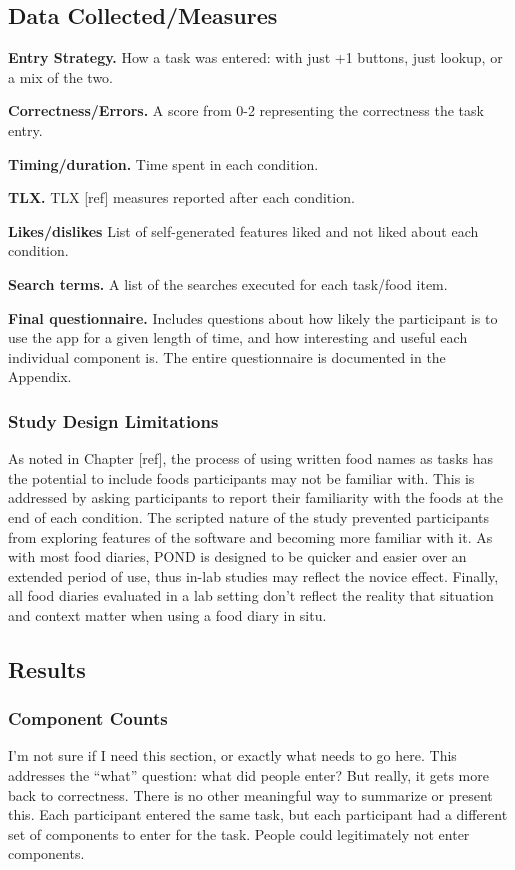 \subsection{Data Collected/Measures}
\begin{enumerate*}
\item \textbf{Entry Strategy.} How a task was entered: with just +1 buttons, just lookup, or a mix of the two. 
\item \textbf{Correctness/Errors. } A score from 0-2 representing the correctness the task entry. 
\item \textbf{Timing/duration.} Time spent in each condition. 
\item \textbf{TLX.} TLX [ref] measures reported after each condition. 
\item \textbf{Likes/dislikes} List of self-generated features liked and not liked about each condition. 
\item \textbf{Search terms.} A list of the searches executed for each task/food item. 
\item \textbf{Final questionnaire.} Includes questions about how likely the participant is to use the app for a given length of time, and how interesting and useful each individual component is. The entire questionnaire is documented in the Appendix. 
\end{enumerate*}


\subsubsection{Study Design Limitations}
As noted in Chapter [ref], the process of using written food names as tasks has the potential to include foods participants may not be familiar with. This is addressed by asking participants to report their familiarity with the foods at the end of each condition. The scripted nature of the study prevented participants from exploring features of the software and becoming more familiar with it. As with most food diaries, POND is designed to be quicker and easier over an extended period of use, thus in-lab studies may reflect the novice effect. Finally, all food diaries evaluated in a lab setting don't reflect the reality that  situation and context matter when using a food diary in situ. 

\subsection{Results}

\subsubsection{Component Counts}
I'm not sure if I need this section, or exactly what needs to go here. This addresses the ``what'' question: what did people enter? But really, it gets more back to correctness. There is no other meaningful way to summarize or present this. Each participant entered the same task, but each participant had a different set of components to enter for the task. People could legitimately not enter components. 

